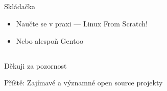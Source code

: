 \documentclass{beamer}
\begin{document}
\subsection{}
\begin{frame}{Skládačka}
\begin{itemize}
\item Naučte se v praxi --- Linux From Scratch!
\item Nebo alespoň Gentoo
\end{itemize}
\end{frame}

\subsection{}
\begin{frame}{Děkuji za pozornost}
\begin{center}
Příště: Zajímavé a významné open source projekty
\end{center}
\end{frame}
\end{document}
